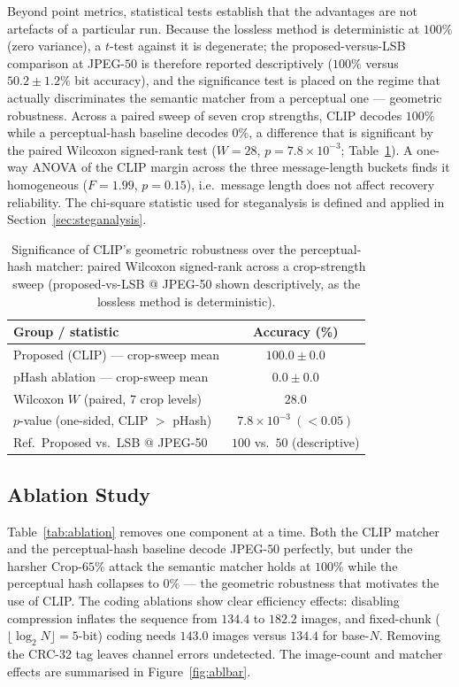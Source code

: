 \documentclass[11pt]{article}
\begin{document}
Beyond point metrics, statistical tests establish that the advantages are not
artefacts of a particular run. Because the lossless method is deterministic at
$100\%$ (zero variance), a $t$-test against it is degenerate; the proposed-versus-LSB
comparison at JPEG-$50$ is therefore reported descriptively ($100\%$ versus
$50.2\pm1.2\%$ bit accuracy), and the significance test is placed on the regime that
actually discriminates the semantic matcher from a perceptual one --- geometric
robustness. Across a paired sweep of seven crop strengths, CLIP decodes $100\%$
while a perceptual-hash baseline decodes $0\%$, a difference that is significant by
the paired Wilcoxon signed-rank test ($W{=}28$, $p{=}7.8\times10^{-3}$;
Table~\ref{tab:signif}). A one-way ANOVA of the CLIP margin across the three
message-length buckets finds it homogeneous ($F{=}1.99$, $p{=}0.15$), i.e.\ message
length does not affect recovery reliability. The chi-square statistic used for
steganalysis is defined and applied in Section~\ref{sec:steganalysis}.

\begin{table}[H]
\centering
\caption{Significance of CLIP's geometric robustness over the perceptual-hash matcher: paired Wilcoxon signed-rank across a crop-strength sweep (proposed-vs-LSB @ JPEG-50 shown descriptively, as the lossless method is deterministic).}\label{tab:signif}
\begin{tabular}{@{}lc@{}}
\toprule
Group / statistic & Accuracy (\%) \\
\midrule
Proposed (CLIP) --- crop-sweep mean & $100.0\pm0.0$ \\
pHash ablation --- crop-sweep mean  & $0.0\pm0.0$ \\
\midrule
Wilcoxon $W$ (paired, 7 crop levels) & $28.0$ \\
$p$-value (one-sided, CLIP $>$ pHash) & $7.8\times10^{-3}\ (<0.05)$ \\
Ref.\ Proposed vs.\ LSB @ JPEG-50 & $100$ vs.\ $50$ (descriptive) \\
\bottomrule
\end{tabular}
\end{table}

\subsection{Ablation Study}\label{sec:ablation}
Table~\ref{tab:ablation} removes one component at a time. Both the CLIP matcher and
the perceptual-hash baseline decode JPEG-$50$ perfectly, but under the harsher
Crop-$65\%$ attack the semantic matcher holds at $100\%$ while the perceptual hash
collapses to $0\%$ --- the geometric robustness that motivates the use of CLIP. The
coding ablations show clear efficiency effects: disabling compression inflates the
sequence from $134.4$ to $182.2$ images, and fixed-chunk ($\lfloor\log_2 N\rfloor{=}5$-bit)
coding needs $143.0$ images versus $134.4$ for base-$N$. Removing the CRC-32 tag
leaves channel errors undetected. The image-count and matcher effects are summarised
in Figure~\ref{fig:ablbar}.
\end{document}
